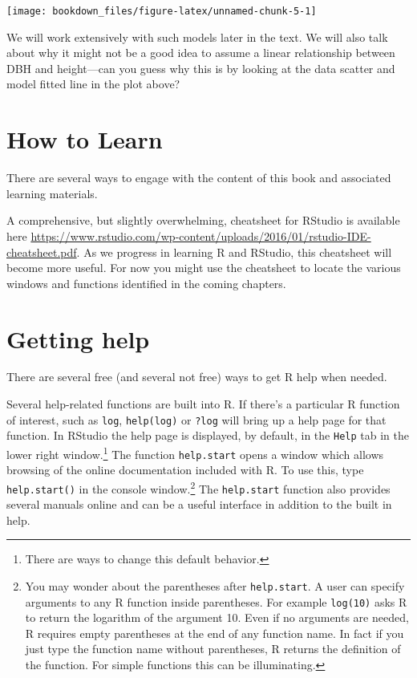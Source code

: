 \documentclass[]{krantz}
\theoremstyle{definition}
\theoremstyle{definition}
\theoremstyle{definition}
\theoremstyle{remark}
\begin{document}
\begin{center}\texttt{[image: bookdown\_files/figure-latex/unnamed-chunk-5-1]} \end{center}

We will work extensively with such models later in the text. We will
also talk about why it might not be a good idea to assume a linear
relationship between DBH and height---can you guess why this is by
looking at the data scatter and model fitted line in the plot above?

\section{How to Learn}\label{how-to-learn}

There are several ways to engage with the content of this book and
associated learning materials.

A comprehensive, but slightly overwhelming, cheatsheet for RStudio is
available here
\url{https://www.rstudio.com/wp-content/uploads/2016/01/rstudio-IDE-cheatsheet.pdf}.
As we progress in learning R and RStudio, this cheatsheet will become
more useful. For now you might use the cheatsheet to locate the various
windows and functions identified in the coming chapters.

\section{Getting help}\label{getting-help}

There are several free (and several not free) ways to get R help when
needed.

Several help-related functions are built into R. If there's a particular
R function of interest, such as \texttt{log}, \texttt{help(log)} or
\texttt{?log} will bring up a help page for that function. In RStudio
the help page is displayed, by default, in the \texttt{Help} tab in the
lower right window.\footnote{There are ways to change this default
  behavior.} The function \texttt{help.start} opens a window which
allows browsing of the online documentation included with R. To use
this, type \texttt{help.start()} in the console window.\footnote{You may
  wonder about the parentheses after \texttt{help.start}. A user can
  specify arguments to any R function inside parentheses. For example
  \texttt{log(10)} asks R to return the logarithm of the argument 10.
  Even if no arguments are needed, R requires empty parentheses at the
  end of any function name. In fact if you just type the function name
  without parentheses, R returns the definition of the function. For
  simple functions this can be illuminating.} The \texttt{help.start}
function also provides several manuals online and can be a useful
interface in addition to the built in help.
\end{document}
